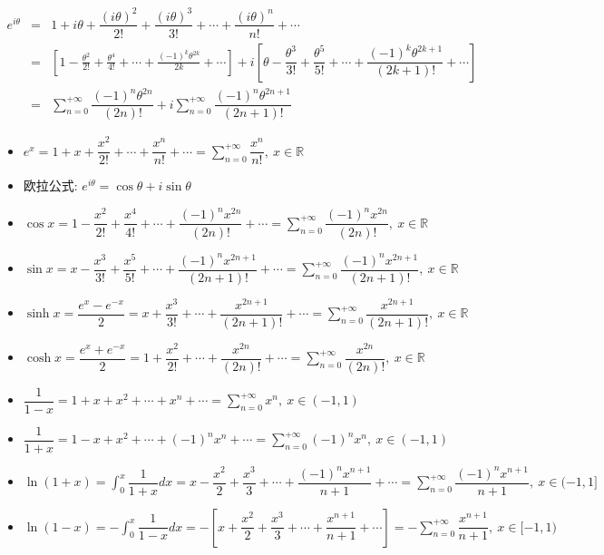 \begin{anymark}[泰勒级数]
	\begin{eqnarray*}
		e^{i\theta}&=&1+i\theta+\dfrac{(i\theta)^2}{2!}+\dfrac{(i\theta)^3}{3!}+\cdots+\dfrac{(i\theta)^n}{n!}+\cdots\\
		&=&[1-\frac{\theta^2}{2!}+\frac{\theta^4}{4!}+\cdots+\frac{(-1)^{k}\theta^{2k}}{2k}+\cdots]+i[\theta-\dfrac{\theta^3}{3!}+\dfrac{\theta^5}{5!}+\cdots+\dfrac{(-1)^{k}\theta^{2k+1}}{(2k+1)!}+\cdots]\\
		&=&\sum\limits_{n=0}^{+\infty}\dfrac{(-1)^{n}\theta^{2n}}{(2n)!}+i\sum\limits_{n=0}^{+\infty}\dfrac{(-1)^{n}\theta^{2n+1}}{(2n+1)!}
	\end{eqnarray*} 
	\begin{itemize}
		\item $e^{x}=1+x+\dfrac{x^2}{2!}+\cdots+\dfrac{x^n}{n!}+\cdots=\sum\limits_{n=0}^{+\infty}\dfrac{x^n}{n!},\ x\in \mathbb{R}$
		\item $\text{欧拉公式: }e^{i\theta}=\cos\theta+i\sin\theta$
		\item $\cos x=1-\dfrac{x^2}{2!}+\dfrac{x^4}{4!}+\cdots+\dfrac{(-1)^{n}x^{2n}}{(2n)!}+\cdots=\sum\limits_{n=0}^{+\infty}\dfrac{(-1)^{n}x^{2n}}{(2n)!},\ x\in\mathbb{R}$
		\item $\sin x=x-\dfrac{x^3}{3!}+\dfrac{x^5}{5!}+\cdots+\dfrac{(-1)^{n}x^{2n+1}}{(2n+1)!}+\cdots=\sum\limits_{n=0}^{+\infty}\dfrac{(-1)^{n}x^{2n+1}}{(2n+1)!},\ x\in\mathbb{R}$
		\item $\sinh x=\dfrac{e^x-e^{-x}}{2}=x+\dfrac{x^3}{3!}+\cdots+\dfrac{x^{2n+1}}{(2n+1)!}+\cdots=\sum\limits_{n=0}^{+\infty}\dfrac{x^{2n+1}}{(2n+1)!},\ x\in\mathbb{R}$
		\item $\cosh x=\dfrac{e^x+e^{-x}}{2}=1+\dfrac{x^2}{2!}+\cdots+\dfrac{x^{2n}}{(2n)!}+\cdots=\sum\limits_{n=0}^{+\infty}\dfrac{x^{2n}}{(2n)!},\ x\in\mathbb{R}$
		\item $\dfrac{1}{1-x}=1+x+x^2+\cdots+x^n+\cdots=\sum\limits_{n=0}^{+\infty}x^n,\ x\in(-1,1)$
		\item $\dfrac{1}{1+x}=1-x+x^2+\cdots+(-1)^nx^n+\cdots=\sum\limits_{n=0}^{+\infty}(-1)^nx^n,\ x\in(-1,1)$
		\item $\ln(1+x)=\int_{0}^{x}\dfrac{1}{1+x}dx=x-\dfrac{x^2}{2}+\dfrac{x^3}{3}+\cdots+\dfrac{(-1)^{n}x^{n+1}}{n+1}+\cdots=\sum\limits_{n=0}^{+\infty}\dfrac{(-1)^{n}x^{n+1}}{n+1},\ x\in(-1,1]$
		\item 
		$\ln(1-x)=-\int_{0}^{x}\dfrac{1}{1-x}dx=-[x+\dfrac{x^2}{2}+\dfrac{x^3}{3}+\cdots+\dfrac{x^{n+1}}{n+1}+\cdots]=-\sum\limits_{n=0}^{+\infty}\dfrac{x^{n+1}}{n+1},\ x\in[-1,1)$

\end{itemize}
\end{anymark}
